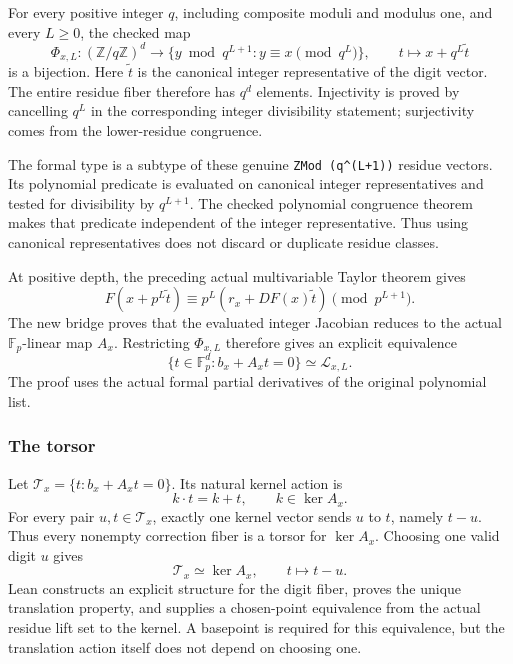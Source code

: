 For every positive integer \(q\), including composite moduli and modulus
one, and every \(L\ge0\), the checked map \[
\Phi_{x,L}:(\mathbb Z/q\mathbb Z)^d\longrightarrow
\{y\bmod q^{L+1}:y\equiv x\pmod{q^L}\},
\qquad t\longmapsto x+q^L\widetilde t
\] is a bijection. Here \(\widetilde t\) is the canonical integer
representative of the digit vector. The entire residue fiber therefore
has \(q^d\) elements. Injectivity is proved by cancelling \(q^L\) in the
corresponding integer divisibility statement; surjectivity comes from
the lower-residue congruence.

The formal type  is a subtype of these genuine
\texttt{ZMod\ (q\^{}(L+1))} residue vectors. Its polynomial predicate is
evaluated on canonical integer representatives and tested for
divisibility by \(q^{L+1}\). The checked polynomial congruence theorem
makes that predicate independent of the integer representative. Thus
using canonical representatives does not discard or duplicate residue
classes.

At positive depth, the preceding actual multivariable Taylor theorem
gives \[
F(x+p^L\widetilde t)\equiv
p^L(r_x+DF(x)\widetilde t)\pmod{p^{L+1}}.
\] The new bridge proves that the evaluated integer Jacobian reduces to
the actual \(\mathbb F_p\)-linear map \(A_x\). Restricting
\(\Phi_{x,L}\) therefore gives an explicit equivalence \[
\boxed{\{t\in\mathbb F_p^d:b_x+A_xt=0\}\simeq\mathcal L_{x,L}.}
\] The proof uses the actual formal partial derivatives of the original
polynomial list.

\hypertarget{cont2:the-torsor}{%
\subsubsection{The torsor}\label{cont2:the-torsor}}

Let \(\mathcal T_x=\{t:b_x+A_xt=0\}\). Its natural kernel action is \[
k\cdot t=k+t,\qquad k\in\ker A_x.
\] For every pair \(u,t\in\mathcal T_x\), exactly one kernel vector
sends \(u\) to \(t\), namely \(t-u\). Thus every nonempty correction
fiber is a torsor for \(\ker A_x\). Choosing one valid digit \(u\) gives
\[
\mathcal T_x\simeq\ker A_x,
\qquad t\longmapsto t-u.
\] Lean constructs an explicit  structure for the
digit fiber, proves the unique translation property, and supplies a
chosen-point equivalence from the actual residue lift set to the kernel.
A basepoint is required for this equivalence, but the translation action
itself does not depend on choosing one.

